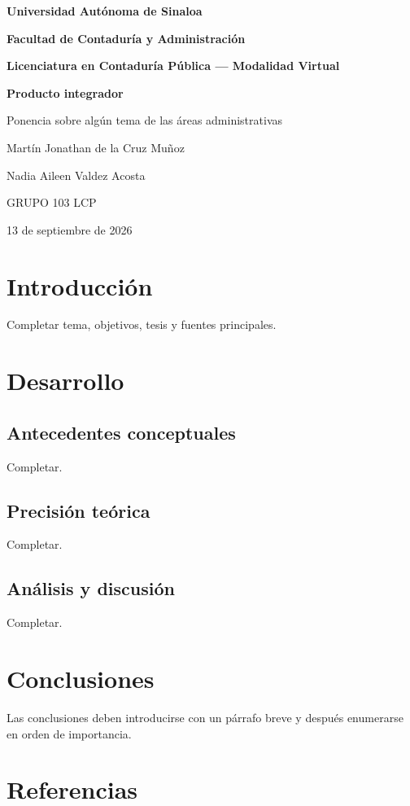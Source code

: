 \documentclass[12pt,letterpaper,oneside]{article}
\begin{document}
\begin{center}
{\bfseries Universidad Autónoma de Sinaloa}\par
{\bfseries Facultad de Contaduría y Administración}\par
{\bfseries Licenciatura en Contaduría Pública — Modalidad Virtual}\par
\vspace{.5cm}
{\Large\bfseries Producto integrador}\par
{\large Ponencia sobre algún tema de las áreas administrativas}\par
\vspace{.5cm}
Martín Jonathan de la Cruz Muñoz\par
Nadia Aileen Valdez Acosta\par
GRUPO 103 LCP\par
13 de septiembre de 2026
\end{center}

\section{Introducción}
Completar tema, objetivos, tesis y fuentes principales.

\section{Desarrollo}
\subsection{Antecedentes conceptuales}
Completar.

\subsection{Precisión teórica}
Completar.

\subsection{Análisis y discusión}
Completar.

\section{Conclusiones}
Las conclusiones deben introducirse con un párrafo breve y después enumerarse en orden de importancia.

\section{Referencias}



\end{document}
